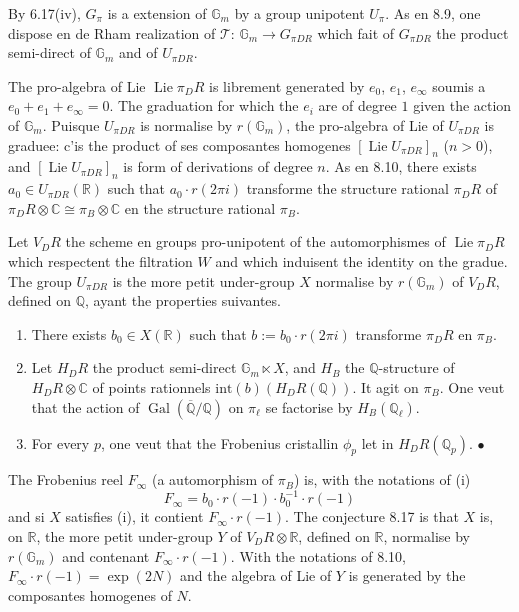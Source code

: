 \documentclass[12pt,a4paper]{article}
\theoremstyle{plain}
\theoremstyle{definition}
\theoremstyle{remark}
\DeclareMathOperator{\Lie}{Lie}
\DeclareMathOperator{\Gal}{Gal}
\newcommand{\Betti}{B}
\newcommand{\dR}{DR}
\newcommand{\Gm}{\mathbb{G}_m}
\newcommand{\QQ}{\mathbb{Q}}
\newcommand{\CC}{\mathbb{C}}
\newcommand{\RR}{\mathbb{R}}
\begin{document}
By 6.17(iv), $G_\pi$ is a extension of $\Gm$ by a group unipotent
$U_\pi$. As en 8.9, one dispose en de Rham realization of
$\mathcal{T}$: $\Gm \to G_{\pi\dR}$ which fait of $G_{\pi\dR}$ the product
semi-direct of $\Gm$ and of $U_{\pi\dR}$.

The pro-algebra of Lie $\Lie \pi_\dR$ is librement generated by
$e_0$, $e_1$, $e_\infty$ soumis a $e_0+e_1+e_\infty = 0$. The graduation
for which the $e_i$ are of degree $1$ given the action of $\Gm$.
Puisque $U_{\pi\dR}$ is normalise by $r(\Gm)$, the pro-algebra of
Lie of $U_{\pi\dR}$ is graduee: c'is the product of ses composantes
homogenes $[\Lie U_{\pi\dR}]_n$ ($n > 0$), and
$[\Lie U_{\pi\dR}]_n$ is form of derivations of degree $n$. As
en 8.10, there exists $a_0 \in U_{\pi\dR}(\RR)$ such that
$a_0 \cdot r(2\pi i)$ transforme the structure rational $\pi_\dR$ of
$\pi_\dR \otimes \CC \cong \pi_\Betti \otimes \CC$ en the structure
rational $\pi_\Betti$.

Let $V_\dR$ the scheme en groups pro-unipotent of the automorphismes of
$\Lie \pi_\dR$ which respectent the filtration $W$ and which induisent
the identity on the gradue. The group $U_{\pi\dR}$ is the more petit
under-group $X$ normalise by $r(\Gm)$ of $V_\dR$, defined on $\QQ$,
ayant the properties suivantes.
\begin{enumerate}
\item[(i)] There exists $b_0 \in X(\RR)$ such that $b := b_0 \cdot r(2\pi i)$
transforme $\pi_\dR$ en $\pi_\Betti$.
\item[(ii)] Let $H_\dR$ the product semi-direct $\Gm \ltimes X$, and
$H_\Betti$ the $\QQ$-structure of $H_\dR \otimes \CC$ of points rationnels
$\mathrm{int}(b)(H_\dR(\QQ))$. It agit on $\pi_\Betti$. One veut that
the action of $\Gal(\overline{\QQ}/\QQ)$ on $\pi_\ell$ se factorise by
$H_\Betti(\QQ_\ell)$.
\item[(iii)] For every $p$, one veut that the Frobenius cristallin
$\phi_p$ let in $H_\dR(\QQ_p)$. \hfill $\bullet$
\end{enumerate}

The Frobenius reel $F_\infty$ (a automorphism of $\pi_\Betti$) is,
with the notations of (i)
\[
F_\infty = b_0 \cdot r(-1) \cdot b_0^{-1} \cdot r(-1)
\]
and si $X$ satisfies (i), it contient $F_\infty \cdot r(-1)$. The conjecture
8.17 is that $X$ is, on $\RR$, the more petit under-group $Y$ of
$V_\dR \otimes \RR$, defined on $\RR$, normalise by $r(\Gm)$ and
contenant $F_\infty \cdot r(-1)$. With the notations of 8.10,
$F_\infty \cdot r(-1) = \exp(2N)$ and the algebra of Lie of $Y$ is
generated by the composantes homogenes of $N$.
\end{document}
